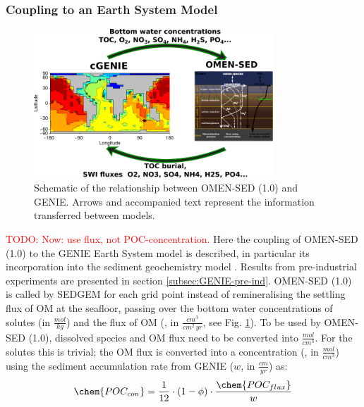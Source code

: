 \documentclass[gmd, manuscript]{copernicus}
\begin{document}
\subsubsection{Coupling to an Earth System Model}\label{subsubsec:ESM_coupling}
\begin{figure}[tbp]
\begin{center}
	\includegraphics[width=0.8\textwidth]{figures/OMEN-GENIE-coupling.pdf}
	\caption{Schematic of the relationship between OMEN-SED (1.0) and GENIE. Arrows and accompanied text represent the information transferred between models. }
	\label{fig:OMEN-GENIE-coupling}
	\end{center}
\end{figure}
\textcolor{red}{TODO: Now: use flux, not POC-concentration.}
Here the coupling of OMEN-SED (1.0) to the GENIE Earth System model is described, in particular its incorporation into the sediment geochemistry model \citep[SEDGEM,][]{ridgwell_regulation_2007}. 
Results from pre-industrial experiments are presented in section \ref{subsec:GENIE-pre-ind}. OMEN-SED (1.0) is called by SEDGEM for each grid point instead of remineralising the settling flux of OM at the seafloor, passing over the 
bottom water concentrations of solutes (in $\frac{mol}{kg}$) and the flux of OM (, in $\frac{cm^3}{cm^2\,yr}$, see Fig. \ref{fig:OMEN-GENIE-coupling}). 
To be used by OMEN-SED (1.0), dissolved species and OM flux need to be converted into $\frac{mol}{cm^3}$. 
For the solutes this is trivial; the OM flux is converted into a concentration (, in $\frac{mol}{cm^3}$) using the sediment accumulation rate from GENIE ($w$, in $\frac{cm}{yr}$) as:
\begin{equation}
 \chem{POC_{con}} = \frac{1}{12}\cdot(1-\phi)\cdot \frac{\chem{POC_{flux}}}{w}
\end{equation}
\end{document}
